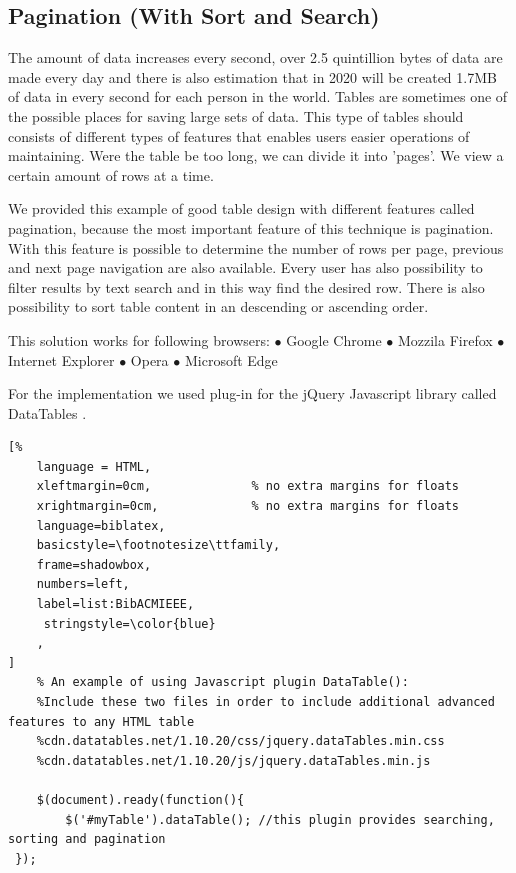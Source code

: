 \subsection{Pagination (With Sort and Search)}
The amount of data increases every second, over 2.5 quintillion bytes of data are made every day and there is also estimation
 that in 2020 will be created 1.7MB of data in every second for each person in the world\parencite{PG_2}. 
\newline 
Tables are sometimes one of the possible places for saving large sets of data.
This type of tables should consists of different types of features that enables users easier operations of maintaining.
\newline
Were the table be too long, we can divide it into 'pages'. We view a certain amount of rows at a time.
\newline

We provided this example of good table design with different features called pagination, because the most important feature of this technique is pagination.
With this feature is possible to determine the number of rows per page, previous  and next page navigation are also available. 
Every user has also possibility to filter results by text search and in this way find the desired row.
There is also possibility to sort table content in an descending or ascending order.

This solution works for following browsers:
\newline $\bullet$ Google Chrome
\newline $\bullet$ Mozzila Firefox
\newline $\bullet$ Internet Explorer
\newline $\bullet$ Opera
\newline $\bullet$ Microsoft Edge

For the implementation we used plug-in for the jQuery Javascript library called DataTables \parencite{PG_1}.


\begin{lstlisting}[%
    language = HTML, 
    xleftmargin=0cm,              % no extra margins for floats
    xrightmargin=0cm,             % no extra margins for floats
    language=biblatex,
    basicstyle=\footnotesize\ttfamily,
    frame=shadowbox,
    numbers=left,
    label=list:BibACMIEEE,
     stringstyle=\color{blue}
    ,
]
    % An example of using Javascript plugin DataTable():
    %Include these two files in order to include additional advanced features to any HTML table
    %cdn.datatables.net/1.10.20/css/jquery.dataTables.min.css
    %cdn.datatables.net/1.10.20/js/jquery.dataTables.min.js

    $(document).ready(function(){
        $('#myTable').dataTable(); //this plugin provides searching, sorting and pagination
 });

\end{lstlisting}

